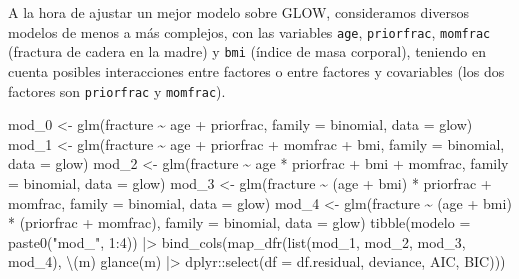 \documentclass[
  letterpaper,
  DIV=11,
  numbers=noendperiod]{scrartcl}
\newenvironment{Shaded}{\begin{snugshade}}{\end{snugshade}}
\newcommand{\AttributeTok}[1]{\textcolor[rgb]{0.40,0.45,0.13}{#1}}
\newcommand{\DecValTok}[1]{\textcolor[rgb]{0.68,0.00,0.00}{#1}}
\newcommand{\FunctionTok}[1]{\textcolor[rgb]{0.28,0.35,0.67}{#1}}
\newcommand{\NormalTok}[1]{\textcolor[rgb]{0.00,0.23,0.31}{#1}}
\newcommand{\OtherTok}[1]{\textcolor[rgb]{0.00,0.23,0.31}{#1}}
\newcommand{\SpecialCharTok}[1]{\textcolor[rgb]{0.37,0.37,0.37}{#1}}
\newcommand{\StringTok}[1]{\textcolor[rgb]{0.13,0.47,0.30}{#1}}
\begin{document}
A la hora de ajustar un mejor modelo sobre GLOW, consideramos diversos
modelos de menos a más complejos, con las variables \texttt{age},
\texttt{priorfrac}, \texttt{momfrac} (fractura de cadera en la madre) y
\texttt{bmi} (índice de masa corporal), teniendo en cuenta posibles
interacciones entre factores o entre factores y covariables (los dos
factores son \texttt{priorfrac} y \texttt{momfrac}).

\begin{Shaded}
\begin{Highlighting}[]
\NormalTok{mod\_0 }\OtherTok{\textless{}{-}} \FunctionTok{glm}\NormalTok{(fracture }\SpecialCharTok{\textasciitilde{}}\NormalTok{ age }\SpecialCharTok{+}\NormalTok{ priorfrac,                     }\AttributeTok{family =}\NormalTok{ binomial, }\AttributeTok{data =}\NormalTok{ glow)}
\NormalTok{mod\_1 }\OtherTok{\textless{}{-}} \FunctionTok{glm}\NormalTok{(fracture }\SpecialCharTok{\textasciitilde{}}\NormalTok{ age }\SpecialCharTok{+}\NormalTok{ priorfrac }\SpecialCharTok{+}\NormalTok{ momfrac }\SpecialCharTok{+}\NormalTok{ bmi,     }\AttributeTok{family =}\NormalTok{ binomial, }\AttributeTok{data =}\NormalTok{ glow)}
\NormalTok{mod\_2 }\OtherTok{\textless{}{-}} \FunctionTok{glm}\NormalTok{(fracture }\SpecialCharTok{\textasciitilde{}}\NormalTok{ age }\SpecialCharTok{*}\NormalTok{ priorfrac }\SpecialCharTok{+}\NormalTok{ bmi }\SpecialCharTok{+}\NormalTok{ momfrac, }\AttributeTok{family =}\NormalTok{ binomial, }\AttributeTok{data =}\NormalTok{ glow)}
\NormalTok{mod\_3 }\OtherTok{\textless{}{-}} \FunctionTok{glm}\NormalTok{(fracture }\SpecialCharTok{\textasciitilde{}}\NormalTok{ (age }\SpecialCharTok{+}\NormalTok{ bmi) }\SpecialCharTok{*}\NormalTok{ priorfrac }\SpecialCharTok{+}\NormalTok{ momfrac, }\AttributeTok{family =}\NormalTok{ binomial, }\AttributeTok{data =}\NormalTok{ glow)}
\NormalTok{mod\_4 }\OtherTok{\textless{}{-}} \FunctionTok{glm}\NormalTok{(fracture }\SpecialCharTok{\textasciitilde{}}\NormalTok{ (age }\SpecialCharTok{+}\NormalTok{ bmi) }\SpecialCharTok{*}\NormalTok{ (priorfrac }\SpecialCharTok{+}\NormalTok{ momfrac), }\AttributeTok{family =}\NormalTok{ binomial, }\AttributeTok{data =}\NormalTok{ glow)}
\FunctionTok{tibble}\NormalTok{(}\AttributeTok{modelo =} \FunctionTok{paste0}\NormalTok{(}\StringTok{"mod\_"}\NormalTok{, }\DecValTok{1}\SpecialCharTok{:}\DecValTok{4}\NormalTok{)) }\SpecialCharTok{|\textgreater{}}
  \FunctionTok{bind\_cols}\NormalTok{(}\FunctionTok{map\_dfr}\NormalTok{(}\FunctionTok{list}\NormalTok{(mod\_1, mod\_2, mod\_3, mod\_4),}
\NormalTok{                    \textbackslash{}(m) }\FunctionTok{glance}\NormalTok{(m) }\SpecialCharTok{|\textgreater{}}\NormalTok{ dplyr}\SpecialCharTok{::}\FunctionTok{select}\NormalTok{(}\AttributeTok{df =}\NormalTok{ df.residual, deviance, AIC, BIC)))}
\end{Highlighting}
\end{Shaded}
\end{document}
